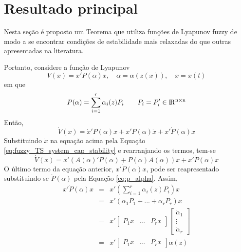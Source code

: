 \section{Resultado principal}\label{sec:resultado_principal}

Nesta seção é proposto um Teorema que utiliza funções de Lyapunov fuzzy de modo a se encontrar condições de estabilidade mais relaxadas do que outras apresentadas na literatura.

Portanto, considere a função de Lyapunov
\begin{equation}\label{eq:lyapunov_func_p_alpha}
V(x) = x'P(\alpha)x, \quad \alpha = \alpha(z(x)), \quad x = x(t)
\end{equation}
em que
\begin{equation}\label{eq:p_alpha}
P(\alpha) = \sum_{i = 1}^{r} \alpha_i(z)P_i\qquad P_i = P_i' \in \rm I\!R^{n \times n}
\end{equation}
Então,
\begin{equation*}
\dot{V}(x) = \dot{x}'P(\alpha)x + x'P(\alpha)\dot{x} + x'\dot{P}(\alpha)x
\end{equation*}
Substituindo $\dot{x}$ na equação acima pela Equação \ref{eq:fuzzy_TS_system_cap_stability} e rearranjando os termos, tem-se
\begin{equation*}
\dot{V}(x) = x'(A(\alpha)'P(\alpha) + P(\alpha)A(\alpha))x + x'\dot{P}(\alpha)x
\end{equation*}
O último termo da equação anterior, $ x'\dot{P}(\alpha)x$, pode ser reapresentado substituindo-se $\dot{P}(\alpha)$ pela Equação \ref{eq:p_alpha}. Assim,
\begin{equation}\label{eq:xT_P_x}
\begin{array} {lcl}
x'\dot{P}(\alpha)x & = & x'(\sum_{i = 1}^{r} \alpha_i(z)P_i)x\\
& = & x'(\dot{\alpha}_1P_1 + ... + \dot{\alpha}_rP_r)x\\
& = & x'\begin{bmatrix}P_1x&...&P_rx\end{bmatrix}\begin{bmatrix}\dot{\alpha}_1\\\vdots\\\dot{\alpha}_r\end{bmatrix}\\
& = & x'\begin{bmatrix}P_1x&...&P_rx\end{bmatrix}\dot{\alpha}(z)
\end{array}
\end{equation}
